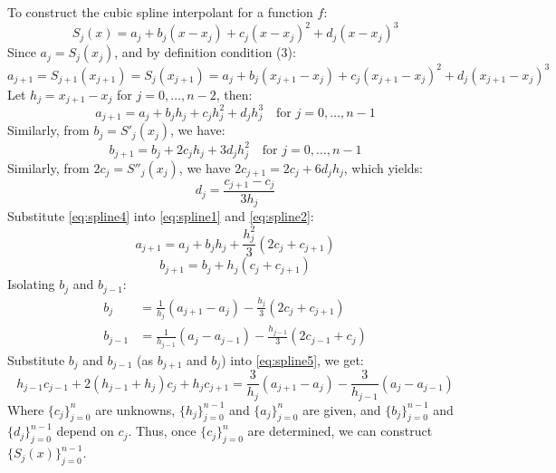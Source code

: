 \documentclass[12pt, a4paper]{article}
\theoremstyle{break}
\begin{document}
To construct the cubic spline interpolant for a function $f$:
\[ S_j(x) = a_j + b_j(x-x_j) + c_j(x-x_j)^2 + d_j(x-x_j)^3 \]
Since $a_j = S_j(x_j)$, and by definition condition (3):
\[ a_{j+1} = S_{j+1}(x_{j+1}) = S_j(x_{j+1}) = a_j + b_j(x_{j+1}-x_j) + c_j(x_{j+1}-x_j)^2 + d_j(x_{j+1}-x_j)^3 \]
Let $h_j = x_{j+1} - x_j$ for $j = 0, \dots, n-2$, then:
\begin{equation}
    a_{j+1} = a_j + b_j h_j + c_j h_j^2 + d_j h_j^3 \quad \text{for } j = 0, \dots, n-1 \label{eq:spline1}
\end{equation}
Similarly, from $b_j = S'_j(x_j)$, we have:
\begin{equation}
    b_{j+1} = b_j + 2c_j h_j + 3d_j h_j^2 \quad \text{for } j = 0, \dots, n-1 \label{eq:spline2}
\end{equation}
Similarly, from $2c_j = S''_j(x_j)$, we have $2c_{j+1} = 2c_j + 6d_j h_j$, which yields:
\begin{equation}
    d_j = \frac{c_{j+1} - c_j}{3h_j} \label{eq:spline4}
\end{equation}
Substitute \eqref{eq:spline4} into \eqref{eq:spline1} and \eqref{eq:spline2}:
\[ a_{j+1} = a_j + b_j h_j + \frac{h_j^2}{3}(2c_j + c_{j+1}) \]
\begin{equation}
    b_{j+1} = b_j + h_j(c_j + c_{j+1}) \label{eq:spline5}
\end{equation}
Isolating $b_j$ and $b_{j-1}$:
\begin{align*}
b_j &= \frac{1}{h_j}(a_{j+1} - a_j) - \frac{h_j}{3}(2c_j + c_{j+1}) \\
b_{j-1} &= \frac{1}{h_{j-1}}(a_j - a_{j-1}) - \frac{h_{j-1}}{3}(2c_{j-1} + c_j)
\end{align*}
Substitute $b_j$ and $b_{j-1}$ (as $b_{j+1}$ and $b_j$) into \eqref{eq:spline5}, we get:
\[ h_{j-1} c_{j-1} + 2(h_{j-1} + h_j)c_j + h_j c_{j+1} = \frac{3}{h_j}(a_{j+1} - a_j) - \frac{3}{h_{j-1}}(a_j - a_{j-1}) \]
Where $\{c_j\}_{j=0}^{n}$ are unknowns, $\{h_j\}_{j=0}^{n-1}$ and $\{a_j\}_{j=0}^{n}$ are given, and $\{b_j\}_{j=0}^{n-1}$ and $\{d_j\}_{j=0}^{n-1}$ depend on $c_j$. Thus, once $\{c_j\}_{j=0}^{n}$ are determined, we can construct $\{S_j(x)\}_{j=0}^{n-1}$.
\end{document}
